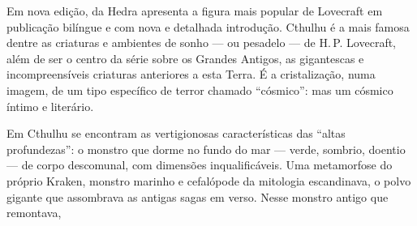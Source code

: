 \medskip

\noindent{}Em nova edição, {} da Hedra apresenta a figura mais popular de Lovecraft em publicação bilíngue e com nova e detalhada introdução. Cthulhu é a mais famosa dentre as criaturas e ambientes de sonho --- ou pesadelo --- de H.\,P. Lovecraft, além de ser o centro da série sobre os Grandes Antigos, as gigantescas e incompreensíveis criaturas anteriores a esta Terra. É a cristalização, numa imagem, de um tipo específico de terror chamado ``cósmico'': mas um cósmico íntimo e literário.

Em Cthulhu se encontram as vertigionosas características das ``altas profundezas'': o monstro que dorme no fundo do mar --- verde, sombrio, doentio --- de corpo descomunal, com dimensões inqualificáveis. Uma metamorfose do próprio Kraken, monstro marinho e cefalópode da mitologia escandinava, o polvo gigante que assombrava as antigas sagas em verso. Nesse monstro antigo que remontava, 

\vfill

\hspace*{-.4cm}\begin{minipage}[c]{.5\linewidth}
\small{
{}}
\end{minipage}

\pagebreak

\vspace*{1.5cm}


\bigskip

\hfill{}

\bigskip
\bigskip
\bigskip

